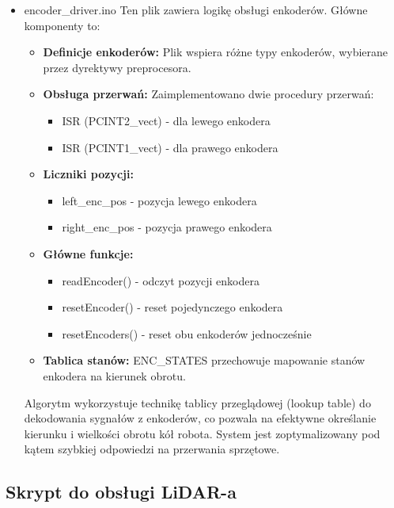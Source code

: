 \documentclass[a4paper,twoside,12pt]{book}
\begin{document}
\begin{itemize}
\newpage
	\item encoder\_driver.ino
	Ten plik zawiera logikę obsługi enkoderów. Główne komponenty to:

	\begin{itemize}
	\item \textbf{Definicje enkoderów:} Plik wspiera różne typy enkoderów, wybierane przez dyrektywy preprocesora.

	\item \textbf{Obsługa przerwań:} Zaimplementowano dwie procedury przerwań:
		\begin{itemize}
		\item ISR (PCINT2\_vect) - dla lewego enkodera
		\item ISR (PCINT1\_vect) - dla prawego enkodera
		\end{itemize}

	\item \textbf{Liczniki pozycji:} 
		\begin{itemize}
		\item left\_enc\_pos - pozycja lewego enkodera
		\item right\_enc\_pos - pozycja prawego enkodera
		\end{itemize}

	\item \textbf{Główne funkcje:}
		\begin{itemize}
		\item readEncoder() - odczyt pozycji enkodera
		\item resetEncoder() - reset pojedynczego enkodera
		\item resetEncoders() - reset obu enkoderów jednocześnie
		\end{itemize}

	\item \textbf{Tablica stanów:} ENC\_STATES przechowuje mapowanie stanów enkodera na kierunek obrotu.

	\end{itemize}

	Algorytm wykorzystuje technikę tablicy przeglądowej (lookup table) do dekodowania sygnałów z enkoderów, co pozwala na efektywne określanie kierunku i wielkości obrotu kół robota. System jest zoptymalizowany pod kątem szybkiej odpowiedzi na przerwania sprzętowe.

\end{itemize}




\newpage
\subsection{Skrypt do obsługi LiDAR-a}
\end{document}
